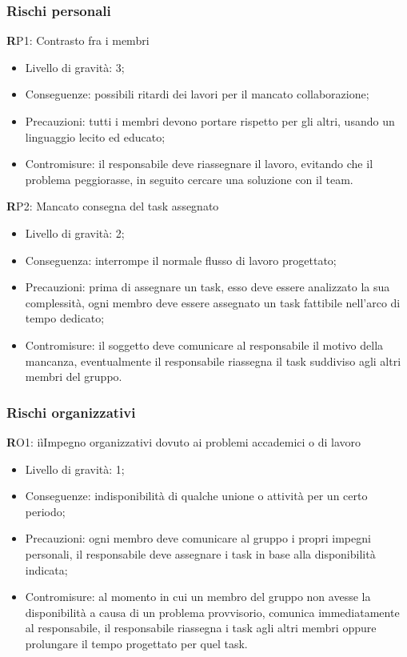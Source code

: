 \subsubsection{Rischi personali}
\textbf RP1: 
Contrasto fra i membri
\begin{itemize}
\item Livello di gravità: 3;
\item Conseguenze: possibili ritardi dei lavori per il mancato collaborazione;
\item Precauzioni: tutti i membri devono portare rispetto per gli altri, usando un linguaggio lecito ed educato;
\item Contromisure: il responsabile deve riassegnare il lavoro, evitando che il problema peggiorasse, in seguito cercare una soluzione con il team.
\end{itemize}
\textbf RP2:
Mancato consegna del task assegnato
\begin{itemize}
\item Livello di gravità: 2;
\item Conseguenza: interrompe il normale flusso di lavoro progettato;
\item Precauzioni: prima di assegnare un task, esso deve essere analizzato la sua complessità, ogni membro deve essere assegnato un task fattibile nell'arco di tempo dedicato;
\item Contromisure: il soggetto deve comunicare al responsabile il motivo della mancanza, eventualmente il responsabile riassegna il task suddiviso agli altri membri del gruppo.
\end{itemize}

\subsubsection{Rischi organizzativi}
\textbf RO1: 
iìImpegno organizzativi dovuto ai problemi accademici o di lavoro
\begin{itemize}
\item Livello di gravità: 1;
\item Conseguenze: indisponibilità di qualche unione o attività per un certo periodo;
\item Precauzioni: ogni membro deve comunicare al gruppo i propri impegni personali, il responsabile deve assegnare i task in base alla disponibilità indicata;
\item Contromisure: al momento in cui un membro del gruppo non avesse la disponibilità a causa di un problema provvisorio, comunica immediatamente al responsabile, il responsabile riassegna i task agli altri membri oppure prolungare il tempo progettato per quel task.
\end{itemize}

